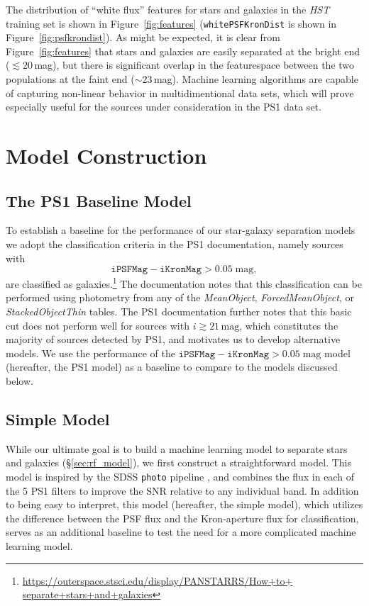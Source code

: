\documentclass[twocolumn]{aastex62}
\begin{document}
The distribution of ``white flux'' features for stars and galaxies in the
\textit{HST} training set is shown in Figure~\ref{fig:features}
(\texttt{whitePSFKronDist} is shown in Figure~\ref{fig:psfkrondist}). As
might be expected, it is clear from Figure~\ref{fig:features} that stars and
galaxies are easily separated at the bright end ($\lesssim 20$\,mag), but
there is significant overlap in the featurespace between the two populations
at the faint end ($\sim$23\,mag). Machine learning algorithms are capable of
capturing non-linear behavior in multidimentional data sets, which will
prove especially useful for the sources under consideration in the PS1 data
set.

\section{Model Construction}
\subsection{The PS1 Baseline Model}\label{sec:ps1_model}

To establish a baseline for the performance of our star-galaxy separation
models we adopt the classification criteria in the PS1 documentation, namely
sources with 
%
$$ \mathtt{iPSFMag} - \mathtt{iKronMag} > 0.05\;\mathrm{mag},$$
%
are classified as
galaxies.\footnote{\url{https://outerspace.stsci.edu/display/PANSTARRS/How+to+
separate+stars+and+galaxies}} The documentation notes that this
classification can be performed using photometry from any of the
\textit{MeanObject}, \textit{ForcedMeanObject}, or \textit{StackedObjectThin}
tables. The PS1 documentation further notes that this basic cut does not
perform well for sources with $i \gtrsim 21\,\mathrm{mag}$, which constitutes
the majority of sources detected by PS1, and motivates us to develop
alternative models. We use the performance of the $\mathtt{iPSFMag} -
\mathtt{iKronMag} > 0.05\;\mathrm{mag}$ model (hereafter, the PS1 model) as a
baseline to compare to the models discussed below.

\subsection{Simple Model}\label{sec:simple_model}

While our ultimate goal is to build a machine learning model to separate
stars and galaxies (\S\ref{sec:rf_model}), we first construct a
straightforward model. This model is inspired by the SDSS \texttt{photo}
pipeline \citep{Lupton01}, and combines the flux in each of the 5 PS1 filters
to improve the SNR relative to any individual band. In addition to being easy
to interpret, this model (hereafter, the simple model), which utilizes the
difference between the PSF flux and the Kron-aperture flux for
classification, serves as an additional baseline to test the need for a more
complicated machine learning model.
\end{document}
